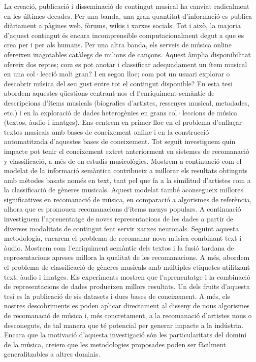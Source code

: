La creació, publicació i disseminació de contingut musical ha canviat radicalment en les últimes decades. Per una banda, una gran quantitat d’informació es publica diàriament a pàgines web, fòrums, wikis i xarxes socials. Tot i això, la majoria d’aquest contingut és encara incomprensible computacionalment degut a que es crea per i per als humans. Per una altra banda, els serveis de música online ofereixen inagotables catàlegs de milions de cançons. Aquest àmplia disponibilitat ofereix dos reptes; com es pot anotar i classificar adequadament un ítem musical en una col·lecció molt gran? I en segon lloc; com pot un usuari explorar o descobrir música del seu gust entre tot el contingut disponible? En esta tesi abordem aquestes qüestions centrant-nos el l’enriquiment semàntic de descripcions d’ítems musicals (biografies d’artistes, ressenyes musical, metadades, etc.) i en la exploració de dades heterogènies en grans col·leccions de música (textos, àudio i imatges). Ens centrem en primer lloc en el problema d’enllaçar textos musicals amb bases de coneixement online i en la construcció automatitzada d’aquestes bases de coneixement.
Tot seguit investiguem quin impacte pot tenir el coneixement extret anteriorment en sistemes de recomanació y classificació, a més de en estudis musicològics. Mostrem a continuació com el modelat de la informació semàntica contribueix a millorar els resultats obtinguts amb métodes basats només en text, tant pel que fa a la similitud d’artistes com a la classificació de gèneres musicals.  Aquest modelat també aconsegueix millores significatives en recomanació de música, en comparació a algorismes de referència, alhora que es promouen recomanacions d’ítems menys populars. A continuació investiguem l'aprenentatge de noves representacions de les dades a partir de diverses modalitats de contingut fent servir xarxes neuronals. Seguint aquesta metodologia, encarem el problema de recomanar nova música combinant text i àudio. Mostrem com l’enriquiment semàntic dels textos i la fusió tardana de representacions apreses millora la qualitat de les recomanacions. A més, abordem el problema de classificació de gèneres musicals amb múltiples etiquetes utilitzant text, àudio i imatges. Els experiments mostren que l’aprenentatge i la combinació de representacions de dades produeixen millors resultats. Un dels fruits d’aquesta tesi es la publicació de sis datasets i dues bases de coneixement. A més, els nostres descobriments es poden aplicar directament al disseny de nous algorismes de recomanació de música i, més concretament, a la recomanació d’artistes nous o desconeguts, de tal manera que té potencial per generar impacte a la indústria. Encara que la motivació d’aquesta investigació són les particularitats del domini de la música, creiem que les metodologies proposades poden ser fàcilment generalitzables a altres dominis.  
